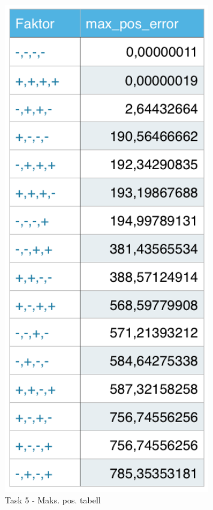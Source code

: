 	\begin{figure}
		\begin{minipage}{.5\textwidth}
			\centering
			\includegraphics[width=0.8\textwidth]{sections/Exercise5/max_pos_error.png}
		    	\caption{Task 5 - Maks. pos. tabell}
		    	\label{fig:task5max_pos_error}
		\end{minipage}

\end{figure}
